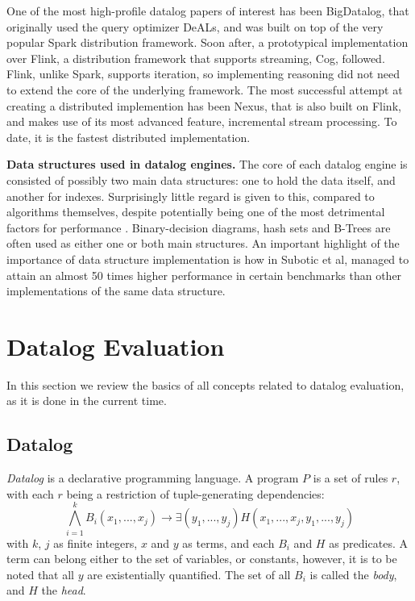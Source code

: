 \documentclass[manuscript,screen,review]{acmart}
\theoremstyle{definition}
\begin{document}
One of the most high-profile datalog papers of interest has been BigDatalog\cite{bigdatalog}, that
originally used the query optimizer DeALs, and was built on top of the very popular Spark\cite{spark}
distribution framework. Soon after, a prototypical implementation\cite{cog} over Flink\cite{flink},
a distribution framework that supports streaming, Cog, followed. Flink, unlike Spark, supports
iteration, so implementing reasoning did not need to extend the core of the underlying framework. The most
successful attempt at creating a distributed implemention has been Nexus\cite{nexus}, that is also built on Flink,
and makes use of its most advanced feature, incremental stream processing. To date, it is the fastest distributed
implementation.

\textbf{Data structures used in datalog engines.} The core of each datalog engine is consisted of possibly
two main data structures: one to hold the data itself, and another for indexes. Surprisingly little regard is given to
this, compared to algorithms themselves, despite potentially being one of the most detrimental factors for performance
. Binary-decision diagrams\cite{bddbddb}, hash sets\cite{microzee} and B-Trees\cite{souffle_btree} are often used as
either one or both main structures. An important highlight of the importance of data structure implementation is how
in \cite{souffle_btree} Subotic et al, managed to attain an almost 50 times higher performance in certain benchmarks
than other implementations of the same data structure.

\section{Datalog Evaluation}

In this section we review the basics of all concepts related to datalog evaluation, as it is done in the current time.

\subsection{Datalog}

\textit{Datalog}\cite{datalog} is a declarative programming language. A program $P$ is a set of
rules $r$, with each $r$ being a restriction of tuple-generating dependencies: \[\bigwedge_{i=1}^kB_i(x_1, ..., x_j) \rightarrow \exists (y_1, ..., y_j)H(x_1, ..., x_j, y_1, ..., y_j)\]
with $k$, $j$ as finite integers, $x$ and $y$ as terms, and each $B_i$ and $H$ as predicates. A term can belong
either to the set of variables, or constants, however, it is to be noted that all $y$ are existentially quantified.
The set of all $B_i$ is called the \textit{body}, and $H$ the \textit{head}.
\end{document}
